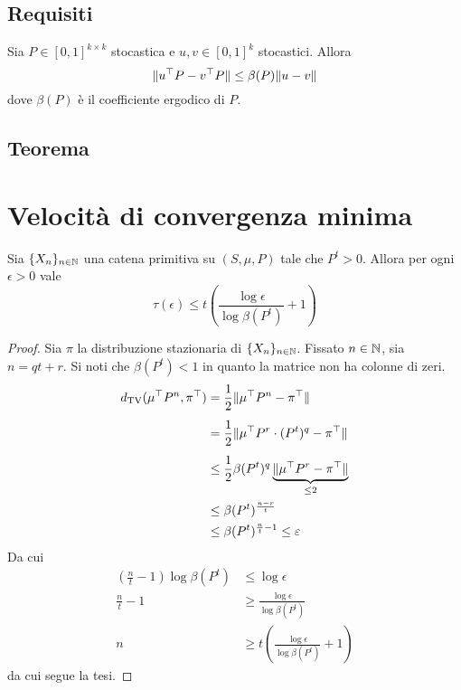 \subsection{Requisiti}
\begin{lemma}[di contrazione]\label{lemma:contra}
	Sia $P\in[0,1]^{k\times k}$ stocastica e $u,v\in[0,1]^k$ stocastici. Allora
	\begin{equation*}
		\|u^\top P-v^\top P\| \le \beta(P)\|u-v\|
	\end{equation*}
	dove $\beta(P)$ è il coefficiente ergodico di $P$.
\end{lemma}


\subsection{Teorema}
\section{Velocità di convergenza minima}
\begin{thm}
	Sia $\{X_n\}_{n\in\mathbb N}$ una catena primitiva su $(S,\mu,P)$ tale che $P^t>0$. Allora per ogni $\epsilon>0$ vale
	\begin{equation*}
		\tau(\epsilon)\le t\left(\frac{\log\epsilon}{\log\beta(P^t)}+1\right)
	\end{equation*}
\end{thm}
\begin{proof}
	Sia $\pi$ la distribuzione stazionaria di $\{X_n\}_{n\in\mathbb N}$. Fissato $n\in\mathbb N$, sia $n=qt+r$. Si noti che $\beta(P^t)<1$ in quanto la matrice non ha colonne di zeri.
	\begin{align*}
		d_{\mathrm{TV}}(\mu^\top P^n,\pi^\top) & = \frac12\|\mu^\top P^n-\pi^\top\|                                   \\[1ex]
		                          & = \frac12\|\mu^\top P^r\cdot (P^t)^q-\pi^\top\|                      \\[1ex]
		                          & \le \frac12\beta(P^t)^q\underbrace{\|\mu^\top P^r-\pi^\top\|}_{\le2} \\
		                          & \le \beta(P^t)^{\frac{n-r}{t}}                                        \\
		                          & \le \beta(P^t)^{\frac n t -1} \le\varepsilon                             \\
	\end{align*}
	Da cui
	\begin{align*}
		\left(\frac nt-1\right)\log\beta(P^t) & \le \log\epsilon                                        \\
		\frac nt-1                            & \ge \frac{\log\epsilon}{\log\beta(P^t)}                 \\
		n                                     & \ge t\left(\frac{\log\epsilon}{\log\beta(P^t)}+1\right)
	\end{align*}
	da cui segue la tesi.
\end{proof}
